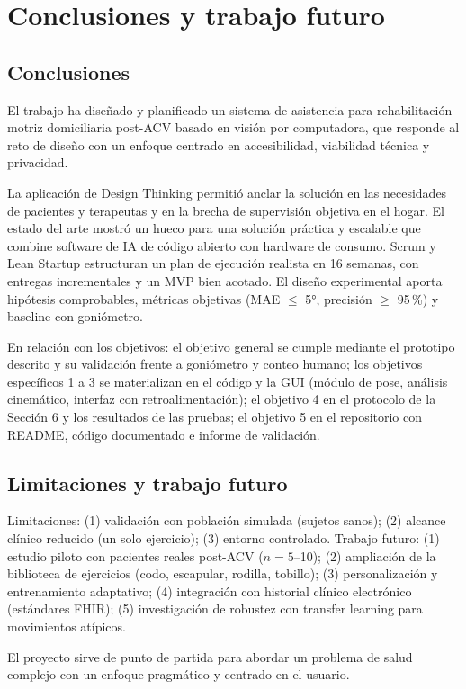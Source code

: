 \documentclass[11pt,a4paper]{article}
\begin{document}
\section{Conclusiones y trabajo futuro}

\subsection{Conclusiones}
El trabajo ha diseñado y planificado un sistema de asistencia para rehabilitación motriz domiciliaria post-ACV basado en visión por computadora, que responde al reto de diseño con un enfoque centrado en accesibilidad, viabilidad técnica y privacidad.

La aplicación de Design Thinking permitió anclar la solución en las necesidades de pacientes y terapeutas y en la brecha de supervisión objetiva en el hogar. El estado del arte mostró un hueco para una solución práctica y escalable que combine software de IA de código abierto con hardware de consumo. Scrum y Lean Startup estructuran un plan de ejecución realista en 16 semanas, con entregas incrementales y un MVP bien acotado. El diseño experimental aporta hipótesis comprobables, métricas objetivas (MAE $\leq$ 5°, precisión $\geq$ 95\,\%) y baseline con goniómetro.

En relación con los objetivos: el objetivo general se cumple mediante el prototipo descrito y su validación frente a goniómetro y conteo humano; los objetivos específicos 1 a 3 se materializan en el código y la GUI (módulo de pose, análisis cinemático, interfaz con retroalimentación); el objetivo 4 en el protocolo de la Sección 6 y los resultados de las pruebas; el objetivo 5 en el repositorio con README, código documentado e informe de validación.

\subsection{Limitaciones y trabajo futuro}
Limitaciones: (1) validación con población simulada (sujetos sanos); (2) alcance clínico reducido (un solo ejercicio); (3) entorno controlado. Trabajo futuro: (1) estudio piloto con pacientes reales post-ACV ($n=5$--10); (2) ampliación de la biblioteca de ejercicios (codo, escapular, rodilla, tobillo); (3) personalización y entrenamiento adaptativo; (4) integración con historial clínico electrónico (estándares FHIR); (5) investigación de robustez con transfer learning para movimientos atípicos.

El proyecto sirve de punto de partida para abordar un problema de salud complejo con un enfoque pragmático y centrado en el usuario.
\end{document}

